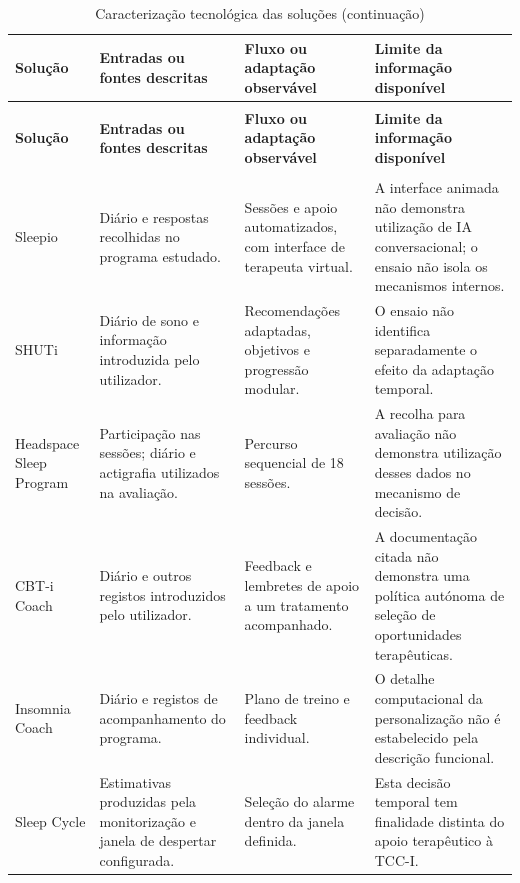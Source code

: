 \begingroup
\small
\renewcommand{\arraystretch}{1.15}
\begin{xltabular}{\textwidth}{@{}>{\raggedright\arraybackslash}p{2.3cm}>{\raggedright\arraybackslash}X>{\raggedright\arraybackslash}X>{\raggedright\arraybackslash}X@{}}
\caption{Caracterização tecnológica das soluções nas fontes consultadas}\label{tab:technologySolutions} \\
\toprule
\textbf{Solução} & \textbf{Entradas ou fontes descritas} & \textbf{Fluxo ou adaptação observável} & \textbf{Limite da informação disponível} \\ \midrule
\endfirsthead
\caption[]{Caracterização tecnológica das soluções (continuação)} \\
\toprule
\textbf{Solução} & \textbf{Entradas ou fontes descritas} & \textbf{Fluxo ou adaptação observável} & \textbf{Limite da informação disponível} \\ \midrule
\endhead
\midrule{}\\
\endfoot
\bottomrule
\endlastfoot
Sleepio & Diário e respostas recolhidas no programa estudado. & Sessões e apoio automatizados, com interface de terapeuta virtual. & A interface animada não demonstra utilização de IA conversacional; o ensaio não isola os mecanismos internos. \\ \midrule
SHUTi & Diário de sono e informação introduzida pelo utilizador. & Recomendações adaptadas, objetivos e progressão modular. & O ensaio não identifica separadamente o efeito da adaptação temporal. \\ \midrule
Headspace Sleep Program & Participação nas sessões; diário e actigrafia utilizados na avaliação. & Percurso sequencial de 18 sessões. & A recolha para avaliação não demonstra utilização desses dados no mecanismo de decisão. \\ \midrule
CBT-i Coach & Diário e outros registos introduzidos pelo utilizador. & Feedback e lembretes de apoio a um tratamento acompanhado. & A documentação citada não demonstra uma política autónoma de seleção de oportunidades terapêuticas. \\ \midrule
Insomnia Coach & Diário e registos de acompanhamento do programa. & Plano de treino e feedback individual. & O detalhe computacional da personalização não é estabelecido pela descrição funcional. \\ \midrule
Sleep Cycle & Estimativas produzidas pela monitorização e janela de despertar configurada. & Seleção do alarme dentro da janela definida. & Esta decisão temporal tem finalidade distinta do apoio terapêutico à TCC-I. \\ \midrule

\end{xltabular}
